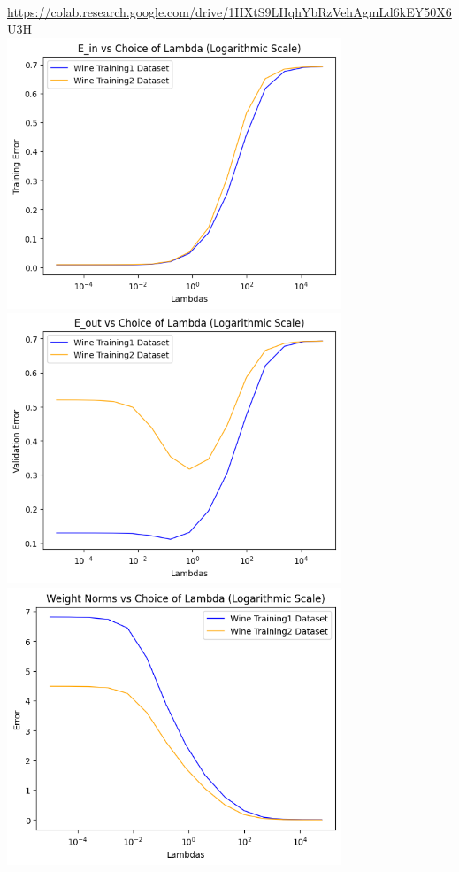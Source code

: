 \begin{solution}
  \\
  \url{https://colab.research.google.com/drive/1HXtS9LHqhYbRzVehAgmLd6kEY50X6U3H}
  \\
  \includegraphics[width=10cm]{images/P2_C_train_err.png} \\
  \includegraphics[width=10cm]{images/P2_C_out_err.png} \\
  \includegraphics[width=10cm]{images/P2_C_weights.png}
\end{solution}

